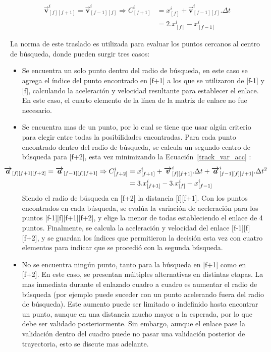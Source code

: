 \begin{equation}
\begin{split}
\boldsymbol{\overrightarrow{v}}_{[f][f+1]}^{i} = \boldsymbol{\overrightarrow{v}}_{[f-1][f]}^{i} \Rightarrow C_{[f+1]}^{i} &= x_{[f]}^{i} + \boldsymbol{\overrightarrow{v}}_{[f-1][f]}^{i}.\Delta{t} \\
&= 2.x_{[f]}^{i} -x_{[f-1]}^{i} 
\end{split}
\label{centro_busqueda_f1}
\end{equation}

La norma de este traslado es utilizada para evaluar los puntos cercanos al centro de búsqueda, donde pueden surgir tres casos:

\begin{itemize}
\item Se encuentra un solo punto dentro del radio de búsqueda, en este caso se agrega el índice del punto encontrado en [f+1] a los que se utilizaron de [f-1] y [f], calculando la aceleración y velocidad resultante para establecer el enlace. En este caso, el cuarto elemento de la línea de la matriz de enlace no fue necesario.
\item Se encuentra mas de un punto, por lo cual se tiene que usar algún criterio para elegir entre todas la posibilidades encontradas. Para cada punto encontrado dentro del radio de búsqueda, se calcula un segundo centro de búsqueda para [f+2], esta vez minimizando la Ecuación~\ref{track_var_acc} :
\begin{equation}
\hspace{-1cm}
\begin{split}
\boldsymbol{\overrightarrow{a}}_{[f][f+1][f+2]}=\boldsymbol{\overrightarrow{a}}_{[f-1][f][f+1]} \Rightarrow C_{[f+2]}^{i} &= x_{[f+1]}^{i} + \boldsymbol{\overrightarrow{v}}_{[f][f+1]}^{i}.\Delta{t} + \boldsymbol{\overrightarrow{a}}_{[f-1][f][f+1]}^{i}.\Delta{t}^2\\
&= 3.x_{[f+1]}^{i} - 3.x_{[f]}^{i} + x_{[f-1]}^{i}\end{split}
\label{centro_busqueda_f2}
\end{equation}
Siendo el radio de búsqueda en [f+2] la distancia [f][f+1]. Con los puntos encontrados en cada búsqueda, se evalúa la variación de aceleración para los puntos [f-1][f][f+1][f+2], y elige la menor de todas estableciendo el enlace de 4 puntos. Finalmente, se calcula la aceleración y velocidad del enlace [f-1][f][f+2], y se guardan los índices que permitieron la decisión esta vez con cuatro elementos para indicar que se procedió con la segunda búsqueda.
\item No se encuentra ningún punto, tanto para la búsqueda en [f+1] como en [f+2]. En este caso, se presentan múltiples alternativas en distintas etapas. La mas inmediata durante el enlazado cuadro a cuadro es aumentar el radio de búsqueda (por ejemplo puede suceder con un punto acelerando fuera del radio de búsqueda). Este aumento puede ser limitado o indefinido hasta encontrar un punto, aunque en una distancia mucho mayor a la esperada, por lo que debe ser validado posteriormente. Sin embargo, aunque el enlace pase la validación dentro del cuadro puede no pasar una validación posterior de trayectoria, esto se discute mas adelante.
\end{itemize}

